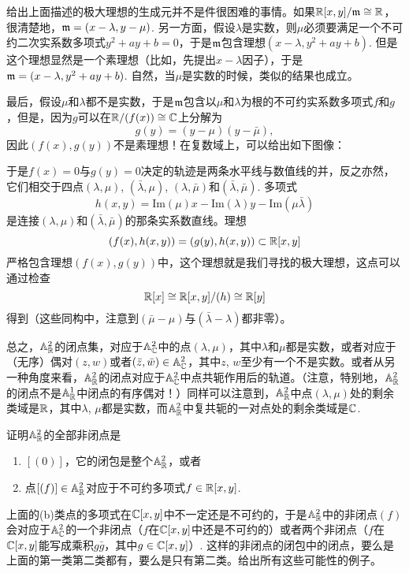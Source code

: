 给出上面描述的极大理想的生成元并不是件很困难的事情。如果$\mathbb{R}[x,y]/\mathfrak{m}\cong \mathbb{R} $，很清楚地，$\mathfrak{m}=(x-\lambda,y-\mu)$. 另一方面，假设$\lambda$是实数，则$\mu$必须要满足一个不可约二次实系数多项式$y^2+ay+b=0$，于是$\mathfrak{m}$包含理想$(x-\lambda,y^2+ay+b)$. 但是这个理想显然是一个素理想（比如，先提出$x-\lambda$因子），于是$\mathfrak{m}=(x-\lambda,y^2+ay+b)$. 自然，当$\mu$是实数的时候，类似的结果也成立。

最后，假设$\mu$和$\lambda$都不是实数，于是$\mathfrak{m}$包含以$\mu$和$\lambda$为根的不可约实系数多项式$f$和$g$，但是，因为$g$可以在$\mathbb{R}/(f(x))\cong \mathbb{C}$上分解为
\[
	g(y)=(y-\mu)(y-\bar\mu),
\]
因此$(f(x),g(y))$不是素理想！在复数域上，可以给出如下图像：


于是$f(x)=0$与$g(y)=0$决定的轨迹是两条水平线与数值线的并，反之亦然，它们相交于四点$(\lambda,\mu)$, $(\bar\lambda,\mu)$, $(\lambda,\bar\mu)$和$(\bar\lambda,\bar\mu)$. 多项式
\[
	h(x,y)=\mathrm{Im}(\mu) x - \mathrm{Im}(\lambda)  y -\mathrm{Im}(\mu\bar\lambda)
\]
是连接$(\lambda,\mu)$和$(\bar\lambda,\bar\mu)$的那条实系数直线。理想
\[
	(f(x),h(x,y))=(g(y),h(x,y))\subset \mathbb{R}[x,y]
\]
严格包含理想$(f(x),g(y))$中，这个理想就是我们寻找的极大理想，这点可以通过检查
\[
	\mathbb{R}[x]\cong \mathbb{R}[x,y]/(h)\cong \mathbb{R}[y]
\]
得到（这些同构中，注意到$(\bar\mu-\mu)$与$(\bar\lambda-\lambda)$都非零）。

总之，$\mathbb{A}_{\mathbb{R}}^2$的闭点集，对应于$\mathbb{A}_{\mathbb{C}}^2$中的点$(\lambda,\mu)$，其中$\lambda$和$\mu$都是实数，或者对应于（无序）偶对$(z,w)$或者$(\bar z,\bar w)\in \mathbb{A}_{\mathbb{C}}^2$，其中$z$, $w$至少有一个不是实数。或者从另一种角度来看，$\mathbb{A}_{\mathbb{R}}^2$的闭点对应于$\mathbb{A}_{\mathbb{C}}^2$中点共轭作用后的轨道。（注意，特别地，$\mathbb{A}_{\mathbb{R}}^2$的闭点不是$\mathbb{A}_{\mathbb{R}}^1$中闭点的有序偶对！）同样可以注意到，$\mathbb{A}_{\mathbb{R}}^2$中点$(\lambda,\mu)$处的剩余类域是$\mathbb{R}$，其中$\lambda$, $\mu$都是实数，而$\mathbb{A}_{\mathbb{R}}^2$中复共轭的一对点处的剩余类域是$\mathbb{C}$.

\begin{exe}
	证明$\mathbb{A}^2_{\mathbb{R}}$的全部非闭点是
	\begin{enumerate}[{(a)}]\setlength{\itemsep}{0pt}
		\item $[(0)]$，它的闭包是整个$\mathbb{A}^2_{\mathbb{R}}$，或者
		\item 点$[(f)]\in \mathbb{A}^2_{\mathbb{R}}$对应于不可约多项式$f\in \mathbb{R}[x,y]$.
	\end{enumerate}

	上面的(b)类点的多项式在$\mathbb{C}[x,y]$中不一定还是不可约的，于是$\mathbb{A}^2_{\mathbb{R}}$中的非闭点$(f)$会对应于$\mathbb{A}^2_{\mathbb{C}}$的一个非闭点（$f$在$\mathbb{C}[x,y]$中还是不可约的）或者两个非闭点（$f$在$\mathbb{C}[x,y]$能写成乘积$g\bar g$，其中$g\in\mathbb{C}[x,y]$）. 这样的非闭点的闭包中的闭点，要么是上面的第一类第二类都有，要么是只有第二类。给出所有这些可能性的例子。
\end{exe}

